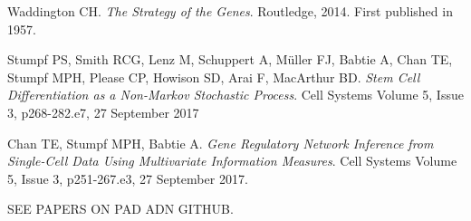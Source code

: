 \documentclass[journal, a4paper]{IEEEtran}
\begin{document}
\begin{thebibliography}{99}
	
	Waddington CH. \textit{The Strategy of the Genes}. Routledge, 2014. First published in 1957. 
	
	Stumpf PS, Smith RCG, Lenz M, Schuppert A, M{\"u}ller FJ, Babtie A,
	Chan TE, Stumpf MPH, Please CP, Howison SD, Arai F, MacArthur BD. \textit{Stem Cell Differentiation as a Non-Markov Stochastic Process}. Cell Systems Volume 5, Issue 3, p268-282.e7, 27 September 2017 
	
	Chan TE, Stumpf MPH, Babtie A. \textit{Gene Regulatory Network Inference from Single-Cell Data Using Multivariate Information Measures}. Cell Systems Volume 5, Issue 3, p251-267.e3, 27 September 2017.
	
	
	SEE PAPERS ON PAD ADN GITHUB.
	
	
\end{thebibliography}

\end{document}
